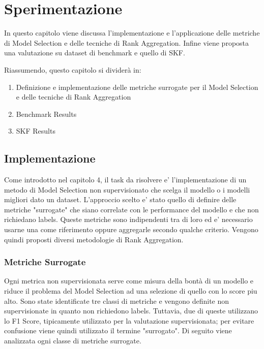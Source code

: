 \chapter{Sperimentazione}
In questo capitolo viene discussa l'implementazione e l'applicazione delle metriche di Model Selection e delle tecniche di Rank Aggregation. Infine viene proposta una valutazione su dataset di benchmark e quello di SKF.

Riassumendo, questo capitolo si dividerà in:
\begin{enumerate}
\item Definizione e implementazione delle metriche surrogate per il Model Selection e delle tecniche di Rank Aggregation
\item Benchmark Results
\item SKF Results
\end{enumerate}


\section{Implementazione}
Come introdotto nel capitolo 4, il task da risolvere e' l'implementazione di un metodo di Model Selection non supervisionato che scelga il modello o i modelli migliori dato un dataset. L'approccio scelto e' stato quello di definire delle metriche "surrogate" che siano correlate con le performance del modello e che non richiedano labels. Queste metriche sono indipendenti tra di loro ed e' necessario usarne una come riferimento oppure aggregarle secondo qualche criterio. Vengono quindi proposti diversi metodologie di Rank Aggregation. 


\subsection{Metriche Surrogate}
Ogni metrica non supervisionata serve come misura della bontà di un modello e riduce il problema del Model Selection ad una selezione di quello con lo score piu alto. 
Sono state identificate tre classi di metriche e vengono definite non supervisionate in quanto non richiedono labels. Tuttavia, due di queste utilizzano lo F1 Score, tipicamente utilizzato per la valutazione supervisionata; per evitare confusione viene quindi utilizzato il termine "surrogato".
Di seguito viene analizzata ogni classe di metriche surrogate.

